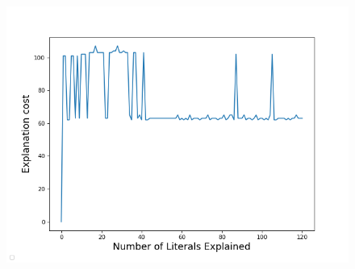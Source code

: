 \begin{figure}[ht]
    \centering
    \includegraphics[width=\columnwidth]{figures/explanation_cost.png}
    \caption{}
    \label{}
\end{figure}

